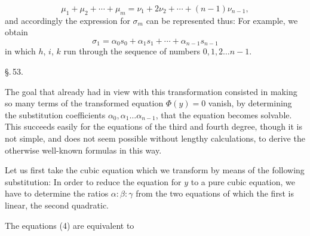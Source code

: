 
\[
\mu_1 + \mu_2 + \cdots + \mu_m = \nu_1 + 2\nu_2 + \cdots + (n-1)\nu_{n-1},
\]
and accordingly the expression for $\sigma_m$ can be represented thus:
For example, we obtain
\[
\sigma_1 = \alpha_0 s_0 + \alpha_1 s_1 + \cdots + \alpha_{n-1} s_{n-1}
\]
in which $h$, $i$, $k$ run through the sequence of numbers $0, 1, 2 \ldots n-1$.

\begin{center}
\S.\,53.

\end{center}

The goal that  already had in view with this transformation consisted in making so many terms of the transformed equation $\Phi(y) = 0$ vanish, by determining the substitution coefficients $\alpha_0, \alpha_1 \ldots \alpha_{n-1}$, that the equation becomes solvable. This succeeds easily for the equations of the third and fourth degree, though it is not simple, and does not seem possible without lengthy calculations, to derive the otherwise well-known formulas in this way.

Let us first take the cubic equation
which we transform by means of the following substitution:
In order to reduce the equation for $y$
to a pure cubic equation, we have to determine the ratios $\alpha:\beta:\gamma$ from the two equations
of which the first is linear, the second quadratic.

The equations (4) are equivalent to
